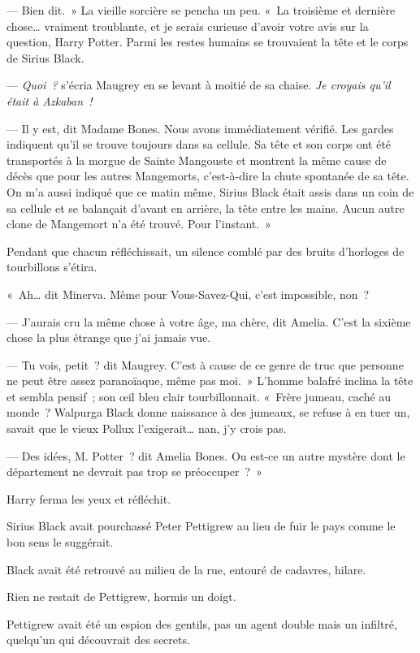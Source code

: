--- Bien dit.~» La vieille sorcière se pencha un peu. «~La troisième et dernière chose… vraiment troublante, et je serais curieuse d'avoir votre avis sur la question, Harry Potter. Parmi les restes humains se trouvaient la tête et le corps de Sirius Black.

--- \emph{Quoi~?} s'écria Maugrey en se levant à moitié de sa chaise. \emph{Je croyais qu'il était à Azkaban~!}

--- Il y est, dit Madame Bones. Nous avons immédiatement vérifié. Les gardes indiquent qu'il se trouve toujours dans sa cellule. Sa tête et son corps ont été transportés à la morgue de Sainte Mangouste et montrent la même cause de décès que pour les autres Mangemorts, c'est-à-dire la chute spontanée de sa tête. On m'a aussi indiqué que ce matin même, Sirius Black était assis dans un coin de sa cellule et se balançait d'avant en arrière, la tête entre les mains. Aucun autre clone de Mangemort n'a été trouvé. Pour l'instant.~»

Pendant que chacun réfléchissait, un silence comblé par des bruits d'horloges de tourbillons s'étira.

«~Ah… dit Minerva. Même pour Vous-Savez-Qui, c'est impossible, non~?

--- J'aurais cru la même chose à votre âge, ma chère, dit Amelia. C'est la sixième chose la plus étrange que j'ai jamais vue.

--- Tu vois, petit~? dit Maugrey. C'est à cause de ce genre de truc que personne ne peut être assez paranoïaque, même pas moi.~» L'homme balafré inclina la tête et sembla pensif~; son œil bleu clair tourbillonnait. «~Frère jumeau, caché au monde~? Walpurga Black donne naissance à des jumeaux, se refuse à en tuer un, savait que le vieux Pollux l'exigerait… nan, j'y crois pas.

--- Des idées, M. Potter~? dit Amelia Bones. Ou est-ce un autre mystère dont le département ne devrait pas trop se préoccuper~?~»

Harry ferma les yeux et réfléchit.

Sirius Black avait pourchassé Peter Pettigrew au lieu de fuir le pays comme le bon sens le suggérait.

Black avait été retrouvé au milieu de la rue, entouré de cadavres, hilare.

Rien ne restait de Pettigrew, hormis un doigt.

Pettigrew avait été un espion des gentils, pas un agent double mais un infiltré, quelqu'un qui découvrait des secrets.

